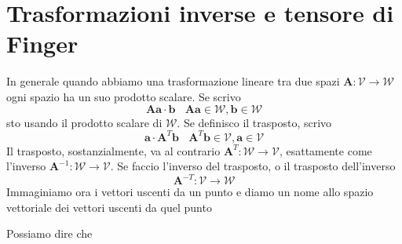 \documentclass[10pt,a4paper,twoside]{book}
\begin{document}
\section{Trasformazioni inverse e tensore di Finger}

In generale quando abbiamo una trasformazione lineare tra due spazi $\mathbf{A} :\mathcal{V}\rightarrow \mathcal{W}$ ogni spazio ha un suo prodotto scalare. Se scrivo
\begin{equation*}
\mathbf{Aa} \cdotp \mathbf{b} \ \ \ \ \mathbf{Aa} \in \mathcal{W} ,\mathbf{b} \in \mathcal{W}
\end{equation*}
sto usando il prodotto scalare di $\mathcal{W}$. Se definisco il trasposto, scrivo
\begin{equation*}
\mathbf{a} \cdotp \mathbf{A}^{T}\mathbf{b} \ \ \ \ \mathbf{A}^{T}\mathbf{b} \in \mathcal{V} ,\mathbf{a} \in \mathcal{V}
\end{equation*}
Il trasposto, sostanzialmente, va al contrario $\mathbf{A}^{T} :\mathcal{W}\rightarrow \mathcal{V}$, esattamente come l'inverso $\mathbf{A}^{-1} :\mathcal{W}\rightarrow \mathcal{V}$. Se faccio l'inverso del trasposto, o il trasposto dell'inverso
\begin{equation*}
\mathbf{A}^{-T} :\mathcal{V}\rightarrow \mathcal{W}
\end{equation*}
Immaginiamo ora i vettori uscenti da un punto e diamo un nome allo spazio vettoriale dei vettori uscenti da quel punto


Possiamo dire che





\end{document}
